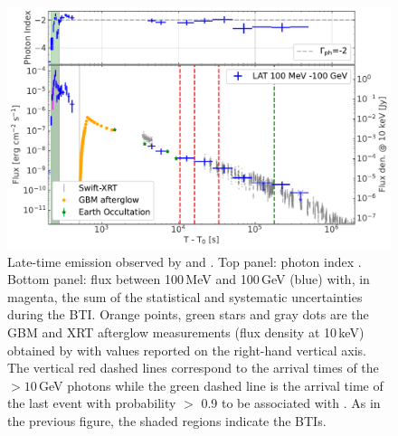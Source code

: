 \documentclass[preprint]{aastex631}
\begin{document}
\begin{figure}[t]
    \centering    
    \includegraphics[width=\textwidth]
    {flux_light_curve_logx_logy.pdf}
    \caption{Late-time emission observed by \Fermi and \Swift. Top panel: photon index . 
    Bottom panel: flux between 100\,MeV and 100\,GeV (blue) with, in magenta, the sum of the statistical and systematic uncertainties during the BTI. 
    Orange points, green stars and gray dots are the \Fermi GBM and \Swift XRT afterglow measurements (flux density at 10\,keV) obtained by \citet{2023ApJ...952L..42L} with values reported on the right-hand vertical axis. The vertical red dashed lines correspond to the arrival times of the $> 10$\,GeV photons while the green dashed line is the arrival time of the last event with probability $>$ 0.9 to be associated with \grb. As in the previous figure, the shaded regions indicate the BTIs.}
    \label{fig:flux_extended}
\end{figure}
\end{document}

